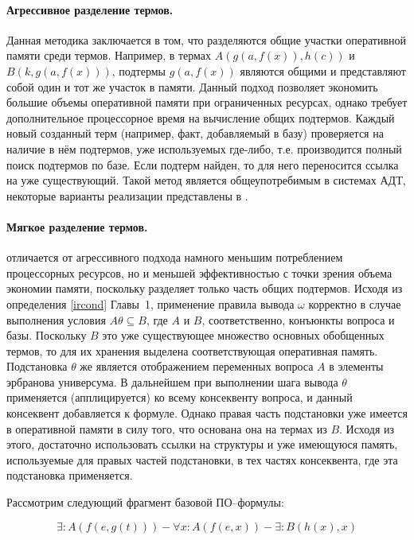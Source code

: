 \paragraph{Агрессивное разделение термов.} Данная методика заключается в том, что разделяются общие участки оперативной памяти среди термов. Например, в термах $A(g(a,f(x)),h(c))$ и $B(k,g(a,f(x)))$, подтермы $g(a,f(x))$ являются общими и представляют собой один и тот же участок в памяти. Данный подход позволяет экономить большие объемы оперативной памяти при ограниченных ресурсах, однако требует дополнительное процессорное время на вычисление общих подтермов. Каждый новый созданный терм (например, факт, добавляемый в базу) проверяется на наличие в нём подтермов, уже используемых где-либо, т.е. производится полный поиск подтермов по базе. Если подтерм найден, то для него переносится ссылка на уже существующий. Такой метод является общеупотребимым в системах АДТ, некоторые варианты реализации представлены в \cite{Ryazanov2003}.

\paragraph{Мягкое разделение термов.} отличается от агрессивного подхода намного меньшим потреблением процессорных ресурсов, но и меньшей эффективностью с точки зрения объема экономии памяти, поскольку разделяет только часть общих подтермов. Исходя из определения \ref{ircond} Главы~1, применение правила вывода $\omega$ корректно в случае выполнения условия $A\theta \subseteq B$, где $A$ и $B$, соответственно, конъюнкты вопроса и базы. Поскольку $B$ это уже существующее множество основных обобщенных термов, то для их хранения выделена соответствующая оперативная память. Подстановка $\theta$ же является отображением переменных вопроса $A$ в элементы эрбранова универсума. В дальнейшем при выполнении шага вывода $\theta$ применяется (апплицируется) ко всему консеквенту вопроса, и данный консеквент добавляется к формуле. Однако правая часть подстановки уже имеется в оперативной памяти в силу того, что основана она на термах из $B$. Исходя из этого, достаточно использовать ссылки на структуры и уже имеющуюся память, используемые для правых частей подстановки, в тех частях консеквента, где эта подстановка применяется.

Рассмотрим следующий фрагмент базовой ПО--формулы:

$$ \exists:A(f(e,g(t))) - \forall x:A(f(e,x)) - \exists:B(h(x),x) $$

